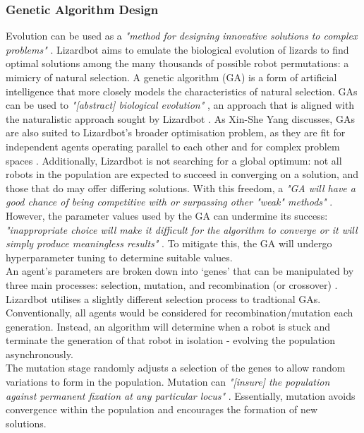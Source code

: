 \documentclass{article}
\begin{document}
\subsubsection{Genetic Algorithm Design}
\label{sec:Genetic Algorithm Aims}
Evolution can be used as a \textit{"method for designing innovative solutions to complex problems"} . Lizardbot aims to emulate the biological evolution of lizards to find optimal solutions among the many thousands of possible robot permutations: a mimicry of natural selection. A genetic algorithm (GA) is a form of artificial intelligence that more closely models the characteristics of natural selection. GAs can be used to \textit{"[abstract] biological evolution"} , an approach that is aligned with the naturalistic approach sought by Lizardbot . As Xin-She Yang discusses, GAs are also suited to Lizardbot's broader optimisation problem, as they are fit for independent agents operating parallel to each other and for complex problem spaces . Additionally, Lizardbot is not searching for a global optimum: not all robots in the population are expected to succeed in converging on a solution, and those that do may offer differing solutions. With this freedom, a \textit{"GA will have a good chance of being competitive with or surpassing other "weak" methods"} . However, the parameter values used by the GA can undermine its success: \textit{"inappropriate choice will make it difficult for the algorithm to converge or it will simply produce meaningless results"} . To mitigate this, the GA will undergo hyperparameter tuning to determine suitable values.\\

An agent’s parameters are broken down into ‘genes’ that can be manipulated by three main processes: selection, mutation, and recombination (or crossover) . \\

\noindent Lizardbot utilises a slightly different selection process to tradtional GAs. Conventionally, all agents would be considered for recombination/mutation each generation. Instead, an algorithm will determine when a robot is stuck and terminate the generation of that robot in isolation - evolving the population asynchronously. \\

\noindent The mutation stage randomly adjusts a selection of the genes to allow  random variations to form in the population. Mutation can \textit{"[insure]
the population against permanent fixation at any particular locus"} . Essentially, mutation avoids convergence within the population and encourages the formation of new solutions. \\
\end{document}
